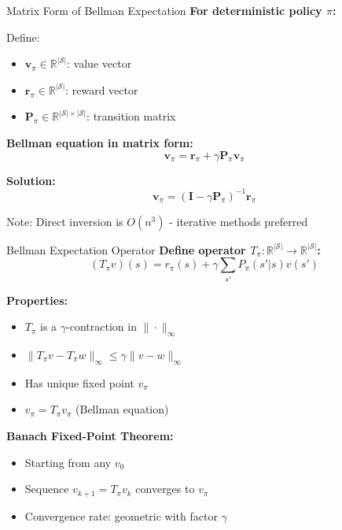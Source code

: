 \documentclass[aspectratio=169,10pt]{beamer}
\begin{document}
\begin{frame}{Matrix Form of Bellman Expectation}
\textbf{For deterministic policy $\pi$:}

Define:
\begin{itemize}
    \item $\mathbf{v}_\pi \in \mathbb{R}^{|\mathcal{S}|}$: value vector
    \item $\mathbf{r}_\pi \in \mathbb{R}^{|\mathcal{S}|}$: reward vector
    \item $\mathbf{P}_\pi \in \mathbb{R}^{|\mathcal{S}| \times |\mathcal{S}|}$: transition matrix
\end{itemize}

\textbf{Bellman equation in matrix form:}
\begin{equation}
\mathbf{v}_\pi = \mathbf{r}_\pi + \gamma \mathbf{P}_\pi \mathbf{v}_\pi
\end{equation}

\textbf{Solution:}
\begin{equation}
\mathbf{v}_\pi = (\mathbf{I} - \gamma \mathbf{P}_\pi)^{-1} \mathbf{r}_\pi
\end{equation}

Note: Direct inversion is $O(n^3)$ - iterative methods preferred
\end{frame}

\begin{frame}{Bellman Expectation Operator}
\textbf{Define operator $T_\pi: \mathbb{R}^{|\mathcal{S}|} \rightarrow \mathbb{R}^{|\mathcal{S}|}$:}
\begin{equation}
(T_\pi v)(s) = r_\pi(s) + \gamma \sum_{s'} P_\pi(s'|s) v(s')
\end{equation}

\textbf{Properties:}
\begin{itemize}
    \item $T_\pi$ is a $\gamma$-contraction in $\|\cdot\|_\infty$
    \item $\|T_\pi v - T_\pi w\|_\infty \leq \gamma \|v - w\|_\infty$
    \item Has unique fixed point $v_\pi$
    \item $v_\pi = T_\pi v_\pi$ (Bellman equation)
\end{itemize}

\textbf{Banach Fixed-Point Theorem:}
\begin{itemize}
    \item Starting from any $v_0$
    \item Sequence $v_{k+1} = T_\pi v_k$ converges to $v_\pi$
    \item Convergence rate: geometric with factor $\gamma$
\end{itemize}
\end{frame}
\end{document}
